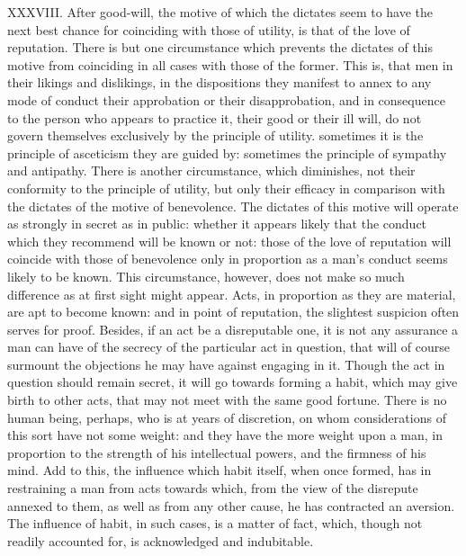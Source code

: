 \documentclass[12pt]{report}
\begin{document}
XXXVIII. After good-will, the motive of which the dictates seem to have
the next best chance for coinciding with those of utility, is that of
the love of reputation. There is but one circumstance which prevents the
dictates of this motive from coinciding in all cases with those of the
former. This is, that men in their likings and dislikings, in the
dispositions they manifest to annex to any mode of conduct their
approbation or their disapprobation, and in consequence to the person
who appears to practice it, their good or their ill will, do not govern
themselves exclusively by the principle of utility. sometimes it is the
principle of asceticism they are guided by: sometimes the principle of
sympathy and antipathy. There is another circumstance, which diminishes,
not their conformity to the principle of utility, but only their
efficacy in comparison with the dictates of the motive of benevolence.
The dictates of this motive will operate as strongly in secret as in
public: whether it appears likely that the conduct which they recommend
will be known or not: those of the love of reputation will coincide with
those of benevolence only in proportion as a man's conduct seems likely
to be known. This circumstance, however, does not make so much
difference as at first sight might appear. Acts, in proportion as they
are material, are apt to become known: and in point of reputation, the
slightest suspicion often serves for proof. Besides, if an act be a
disreputable one, it is not any assurance a man can have of the secrecy
of the particular act in question, that will of course surmount the
objections he may have against engaging in it. Though the act in
question should remain secret, it will go towards forming a habit, which
may give birth to other acts, that may not meet with the same good
fortune. There is no human being, perhaps, who is at years of
discretion, on whom considerations of this sort have not some weight:
and they have the more weight upon a man, in proportion to the strength
of his intellectual powers, and the firmness of his mind. Add to this,
the influence which habit itself, when once formed, has in restraining a
man from acts towards which, from the view of the disrepute annexed to
them, as well as from any other cause, he has contracted an aversion.
The influence of habit, in such cases, is a matter of fact, which,
though not readily accounted for, is acknowledged and indubitable.
\end{document}
